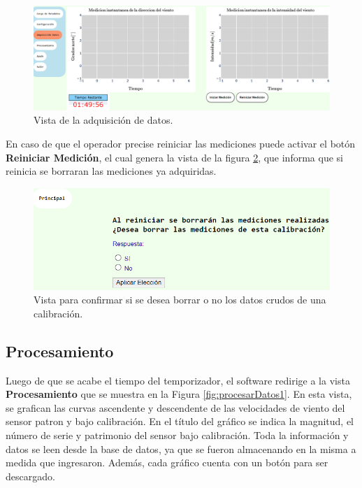 \begin{figure}[H]
    \centering
    \includegraphics[width=1\linewidth]{Figuras/AplicacionWeb/frontend/adquisicionDatos.png}
    \caption{Vista de la adquisición de datos.}
    \label{fig:adquisicionDatos}
\end{figure}

En caso de que el operador precise reiniciar las mediciones puede activar el botón \textbf{Reiniciar Medición}, el cual genera la vista de la figura \ref{fig:borrarMediciones}, que informa que si reinicia se borraran las mediciones ya adquiridas.

\begin{figure}[H]
    \centering
    \includegraphics[width=0.8\linewidth]{Figuras/AplicacionWeb/frontend/borrarMediciones.png}
    \caption{Vista para confirmar si se desea borrar o no los datos crudos de una calibración.}
    \label{fig:borrarMediciones}
\end{figure}



\subsection{Procesamiento}\label{sec:ProcesamientoDatos}
Luego de que se acabe el tiempo del temporizador, el software redirige a la vista \textbf{Procesamiento} que se muestra en la Figura \ref{fig:procesarDatos1}. En esta vista, se grafican las curvas ascendente y descendente de las velocidades de viento del sensor patron y bajo calibración. En el título del gráfico se indica la magnitud, el número de serie y patrimonio del sensor bajo calibración. Toda la información y datos se leen desde la base de datos, ya que se fueron almacenando en la misma a medida que ingresaron. Además, cada gráfico cuenta con un botón para ser descargado.

